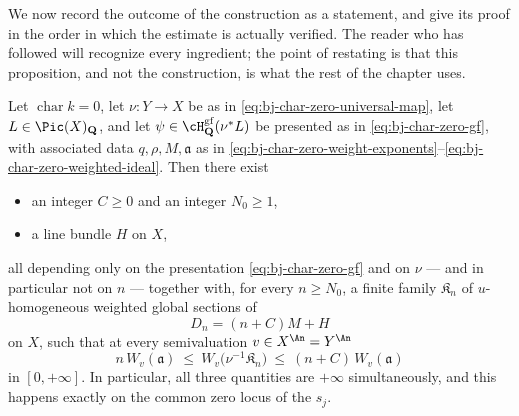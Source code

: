 We now record the outcome of the construction as a statement, and give its
proof in the order in which the estimate is actually verified.  The reader
who has followed  will recognize every
ingredient; the point of restating is that this proposition, and not the
construction, is what the rest of the chapter uses.

\begin{proposition}
\label{prop:ch44-global-sandwich}
Let $\operatorname{char}k=0$, let $\nu:Y\to X$ be as in
\eqref{eq:bj-char-zero-universal-map}, let $L\in\Pic(X)_{\mathbf Q}$, and
let $\psi\in\cH^{\mathrm{gf}}_{\mathbf Q}(\nu^*L)$ be presented as in
\eqref{eq:bj-char-zero-gf}, with associated data
$q,\rho,M,\mathfrak a$ as in
\eqref{eq:bj-char-zero-weight-exponents}--\eqref{eq:bj-char-zero-weighted-ideal}.
Then there exist
\begin{itemize}
\item an integer $C\ge0$ and an integer $N_0\ge1$,
\item a line bundle $H$ on $X$,
\end{itemize}
all depending only on the presentation \eqref{eq:bj-char-zero-gf} and on
$\nu$ --- and in particular not on $n$ --- together with, for every
$n\ge N_0$, a finite family $\mathfrak K_n$ of $u$-homogeneous
weighted global sections of
\[
 D_n=(n+C)M+H
\]
on $X$, such that at every semivaluation $v\in X^{\An}=Y^{\An}$
\[
 n\,W_v(\mathfrak a)
 \ \le\ W_v\bigl(\nu^{-1}\mathfrak K_n\bigr)
 \ \le\ (n+C)\,W_v(\mathfrak a)
\]
in $[0,+\infty]$.  In particular, all three quantities are $+\infty$
simultaneously, and this happens exactly on the common zero locus of the
$s_j$.
\end{proposition}

